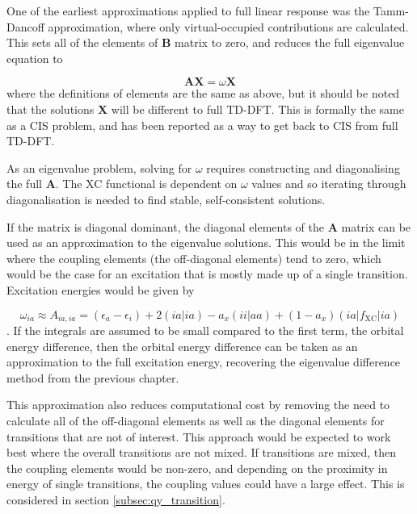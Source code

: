 One of the earliest approximations applied to full linear response was the Tamm-Dancoff
approximation, where only virtual-occupied contributions are calculated. This sets
all of the elements of $\mathbf{B}$ matrix to zero, and reduces the full eigenvalue 
equation to 

\begin{equation}
\mathbf{A} \mathbf{X} = \omega \mathbf{X}
\end{equation}
%
where the definitions of elements are the same as above, but it should be noted 
that the solutions $\mathbf{X}$ will be different to full TD-DFT. This is formally
the same as a CIS problem, and has been reported as a way to get back to CIS from 
full TD-DFT.

As an eigenvalue problem, solving for $\omega$ requires constructing and diagonalising
the full $\mathbf{A}$. The XC functional is dependent on $\omega$ values and so
iterating through diagonalisation is needed to find stable, self-consistent solutions.

If the matrix is diagonal dominant, the diagonal elements of the $\mathbf{A}$ matrix 
can be used as an approximation to the eigenvalue solutions. This would be in the 
limit where the coupling elements (the off-diagonal elements) tend to zero, which
would be the case for an excitation that is mostly made up of a single transition.
Excitation energies would be given by

\begin{equation}
\omega_{ia} \approx A_{ia, ia} = \left( \epsilon_a - \epsilon_i \right) + 2\left(ia|ia\right) - a_x\left(ii|aa\right) + (1- a_x)\left(ia|f_{\text{XC}}|ia\right) 
\label{eq:diag_dom}
\end{equation}
%
. If the integrals are assumed to be small compared to the first term, the orbital 
energy difference, then the orbital energy difference can be taken as an approximation 
to the full excitation energy, recovering the eigenvalue difference method from
the previous chapter.

This approximation also reduces computational cost by removing the need to calculate
all of the off-diagonal elements as well as the diagonal elements for transitions
that are not of interest. This approach would be expected to work best where the
overall transitions are not mixed. If transitions are mixed, then the coupling elements
would be non-zero, and depending on the proximity in energy of single transitions,
the coupling values could have a large effect. This is considered in section \ref{subsec:qy_transition}.

